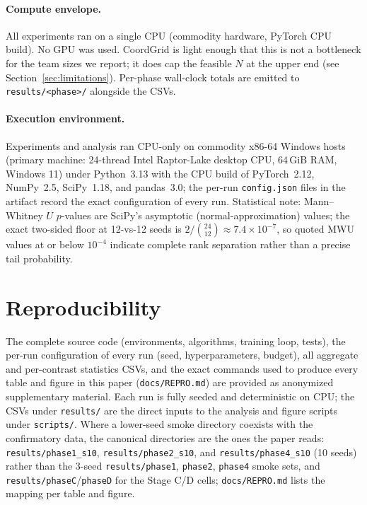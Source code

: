 \documentclass[10pt]{article}
\begin{document}
\paragraph{Compute envelope.} All experiments ran on a single CPU
(commodity hardware, PyTorch CPU build). No GPU was
used. CoordGrid is light enough that this is not a bottleneck for the
team sizes we report; it does cap the feasible $N$ at the upper
end (see Section~\ref{sec:limitations}). Per-phase wall-clock totals are
emitted to \texttt{results/<phase>/} alongside the CSVs.

\paragraph{Execution environment.} Experiments and analysis ran CPU-only on
commodity x86-64 Windows hosts (primary machine: 24-thread Intel Raptor-Lake
desktop CPU, 64\,GiB RAM, Windows 11) under Python~3.13 with the CPU build
of PyTorch~2.12, NumPy~2.5, SciPy~1.18, and pandas~3.0; the per-run
\texttt{config.json} files in the artifact record the exact configuration of
every run. Statistical note: Mann--Whitney $U$ $p$-values are SciPy's
asymptotic (normal-approximation) values; the exact two-sided floor at
12-vs-12 seeds is $2/\binom{24}{12} \approx 7.4\times10^{-7}$, so quoted
MWU values at or below $10^{-4}$ indicate complete rank separation rather
than a precise tail probability.

\section{Reproducibility}
\label{app:repro}

The complete source code (environments, algorithms, training loop, tests),
the per-run configuration of every run (seed, hyperparameters, budget), all
aggregate and per-contrast statistics CSVs, and the exact commands used to
produce every table and figure in this paper (\texttt{docs/REPRO.md}) are
provided as anonymized supplementary material. Each run is fully seeded and
deterministic on CPU; the CSVs under \texttt{results/} are the direct inputs
to the analysis and figure scripts under \texttt{scripts/}. Where a
lower-seed smoke directory coexists with the confirmatory data, the
canonical directories are the ones the paper reads:
\texttt{results/phase1\_s10}, \texttt{results/phase2\_s10}, and
\texttt{results/phase4\_s10} (10 seeds) rather than the 3-seed
\texttt{results/phase1}, \texttt{phase2}, \texttt{phase4} smoke sets, and
\texttt{results/phaseC}/\texttt{phaseD} for the Stage C/D cells;
\texttt{docs/REPRO.md} lists the mapping per table and figure.
\end{document}
